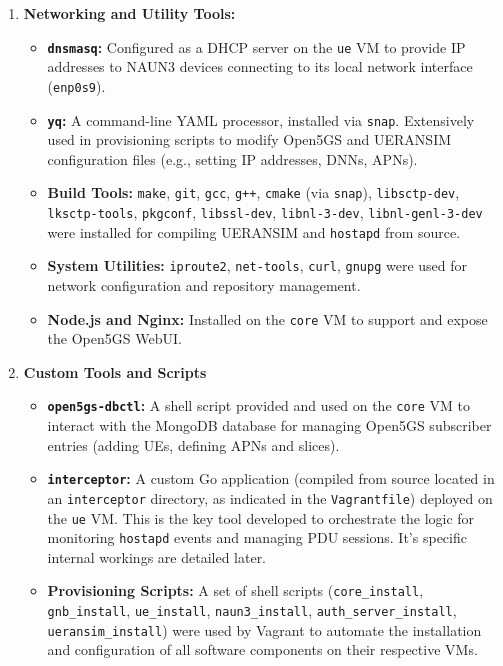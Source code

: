 \begin{enumerate}
    \item {
        \textbf{Networking and Utility Tools:}
        \begin{itemize}
            \item \textbf{\texttt{dnsmasq}:} Configured as a \ac{DHCP} server on the \texttt{ue} \ac{VM} to provide \ac{IP} addresses to \ac{NAUN3} devices connecting to its local network interface (\texttt{enp0s9}).

            \item \textbf{\texttt{yq}:} A command-line YAML processor, installed via \texttt{snap}. Extensively used in provisioning scripts to modify Open5GS and UERANSIM configuration files (e.g., setting \ac{IP} addresses, \acp{DNN}, \acp{APN}).

            \item \textbf{Build Tools:} \texttt{make}, \texttt{git}, \texttt{gcc}, \texttt{g++}, \texttt{cmake} (via \texttt{snap}), \texttt{libsctp-dev}, \texttt{lksctp-tools}, \texttt{pkgconf}, \texttt{libssl-dev}, \texttt{libnl-3-dev}, \texttt{libnl-genl-3-dev} were installed for compiling UERANSIM and \texttt{hostapd} from source.

            \item \textbf{System Utilities:} \texttt{iproute2}, \texttt{net-tools}, \texttt{curl}, \texttt{gnupg} were used for network configuration and repository management.

            \item \textbf{Node.js and Nginx:} Installed on the \texttt{core} \ac{VM} to support and expose the Open5GS WebUI.
        \end{itemize}
    }

    \item {
        \textbf{Custom Tools and Scripts}
        \begin{itemize}
            \item \textbf{\texttt{open5gs-dbctl}:} A shell script provided and used on the \texttt{core} \ac{VM} to interact with the MongoDB database for managing Open5GS subscriber entries (adding \acp{UE}, defining \acp{APN} and slices).

            \item \textbf{\texttt{interceptor}:} A custom Go application (compiled from source located in an \texttt{interceptor} directory, as indicated in the \texttt{Vagrantfile}) deployed on the \texttt{ue} \ac{VM}. This is the key tool developed to orchestrate the logic for monitoring \texttt{hostapd} events and managing \ac{PDU} sessions. It's specific internal workings are detailed later.

            \item \textbf{Provisioning Scripts:} A set of shell scripts (\texttt{core\_install}, \texttt{gnb\_install}, \texttt{ue\_install}, \texttt{naun3\_install}, \texttt{auth\_server\_install}, \texttt{ueransim\_install}) were used by Vagrant to automate the installation and configuration of all software components on their respective \acp{VM}.
        \end{itemize}
    }
\end{enumerate}

